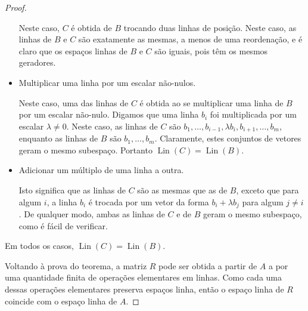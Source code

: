 \begin{proof}
\begin{itemize}
		Neste caso, $C$ é obtida de $B$ trocando duas linhas de posição. Neste caso, as linhas de $B$ e $C$ são exatamente as mesmas, a menos de uma reordenação, e é claro que os espaços linhas de $B$ e $C$ são iguais, pois têm os mesmos geradores.
		
		\item Multiplicar uma linha por um escalar não-nulos.
		
		Neste caso, uma das linhas de $C$ é obtida ao se multiplicar uma linha de $B$ por um escalar não-nulo. Digamos que uma linha $b_i$ foi multiplicada por um escalar $\lambda\neq 0$. Neste caso, as linhas de $C$ são $b_1,\ldots,b_{i-1},\lambda b_i,b_{i+1},\ldots,b_m$, enquanto as linhas de $B$ são $b_1,\ldots,b_m$. Claramente, estes conjuntos de vetores geram o mesmo subespaço. Portanto $\operatorname{Lin}(C)=\operatorname{Lin}(B)$.
		
		\item Adicionar um múltiplo de uma linha a outra.
		
		Isto significa que as linhas de $C$ são as mesmas que as de $B$, exceto que para algum $i$, a linha $b_i$ é trocada por um vetor da forma $b_i+\lambda b_j$ para algum $j\neq i$. De qualquer modo, ambas as linhas de $C$ e de $B$ geram o mesmo subespaço, como é fácil de verificar.
	\end{itemize}
	
	Em todos os casos, $\operatorname{Lin}(C)=\operatorname{Lin}(B)$.
	
	Voltando à prova do teorema, a matriz $R$ pode ser obtida a partir de $A$ a por uma quantidade finita de operações elementares em linhas. Como cada uma dessas operações elementares preserva espaços linha, então o espaço linha de $R$ coincide com o espaço linha de $A$.
\end{proof}